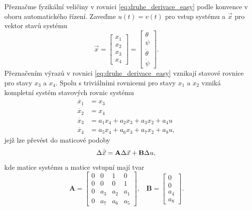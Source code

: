 \documentclass[conference]{IEEEtran}
\begin{document}
Přeznačme fyzikální veličiny v rovnici \eqref{eq:druhe_derivace_easy} podle konvence v oboru automatického řízení.
Zaveďme $u(t) = v(t)$ pro vstup systému a $\vec{x}$ pro vektor stavů systému
\begin{equation}
    \vec{x} = \begin{bmatrix}
        x_1 \\
        x_2 \\
        x_3 \\
        x_4
    \end{bmatrix} = \begin{bmatrix}
        \theta \\
        \psi \\
        \dot{\theta} \\
        \dot{\psi}
    \end{bmatrix}.
\end{equation}
Přeznačením výrazů v rovnici \eqref{eq:druhe_derivace_easy} vznikají stavové rovnice pro stavy $x_3$ a $x_4$. 
Spolu s triviálními rovnicemi pro stavy $x_1$ a $x_2$ vzniká kompletní systém stavových rovnic systému
\begin{equation}
    \begin{split}
        \dot{x_1} &= x_3 \\
        \dot{x_2} &= x_4 \\
        \dot{x_3} & = a_1 x_4 + a_2 x_3 + a_3 x_2 + a_4 u \\
        \dot{x_4} &= a_5  x_4 + a_6 x_3 + a_7 x_2 + a_8 u,
        \label{eq:stavove_rovnice}
    \end{split}
\end{equation}
jejž lze převést do maticové podoby
\begin{equation}
    \Delta \dot{\vec{x}} = \mathbf{A} \Delta \vec{x} + \mathbf{B} \Delta u, \\
\end{equation}
kde matice systému a matice vstupní mají tvar
\begin{equation}
    \mathbf{A} = \begin{bmatrix}
        0 & 0 & 1 & 0 \\
        0 & 0 & 0 & 1 \\
        0 & a_3 & a_2 & a_1 \\
        0 & a_7 & a_6 & a_5
    \end{bmatrix}, ~~~~ \mathbf{B} = \begin{bmatrix}
        0 \\ 0 \\a_4 \\a_8
    \end{bmatrix}.
\end{equation}
\end{document}
